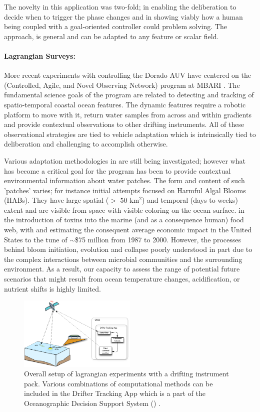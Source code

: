 The novelty in this application was two-fold; in enabling the
deliberation to decide when to trigger the phase changes and in
showing viably how a human being coupled with a goal-oriented
controller could  problem solving. The
approach, is general and can be adapted to any feature or scalar
field.

\paragraph {Lagrangian Surveys:} More recent experiments with \rx
controlling the Dorado AUV have centered on the \can (Controlled,
Agile, and Novel Observing Network) program at MBARI \cite{canon}. The
fundamental science goals of the program are related to detecting and
tracking of spatio-temporal coastal ocean features. The dynamic
features require a robotic platform to move with it, return water
samples from across and within gradients and provide contextual
observations to other drifting instruments. All of these observational
strategies are tied to vehicle adaptation which is intrinsically tied
to deliberation and challenging to accomplish otherwise.

Various adaptation methodologies in \can are still being investigated;
however what has become a critical goal for the program has been to
provide contextual environmental information about water patches. The
form and content of such 'patches' varies; for instance initial
attempts focused on Harmful Algal Blooms (HABs). They have large
spatial ($>$ 50 km$^2$) and temporal (days to weeks) extent and are
visible from space with visible coloring on the ocean
surface.  in the
introduction of toxins into the marine (and as a consequence human)
food web, with \cite{anderson00} and \cite{hoagland06} estimating the
consequent average economic impact in the United States to the tune of
$\sim$\$75 million from 1987 to 2000. However, the processes behind
bloom initiation, evolution and collapse  poorly
understood in part due to the complex interactions between microbial
communities and the surrounding environment. As a result, our capacity
to assess the range of potential future scenarios that might result
from ocean temperature changes, acidification, or nutrient shifts is
highly limited.

\begin{figure}[t]
\centering
\includegraphics[width=0.5\textwidth]{figs/dta-app.pdf}
\caption{\small{Overall setup of \can lagrangian experiments with a
    drifting instrument pack. Various combinations of computational
    methods can be included in the Drifter Tracking App which is a
    part of the Oceanographic Decision Support System (\od)
    \cite{das11}.}}
\label{fig:dta-setup}
\end{figure}

